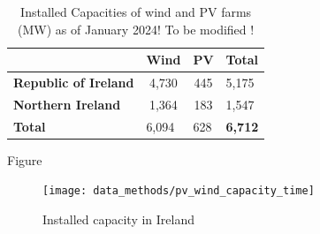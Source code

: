 \documentclass[a4paper, 11pt]{article}
\begin{document}
\begin{table}[!ht]
	\centering
	\begin{tabular}{l|cc|l|}
		\cline{2-4}
		& \textbf{Wind} & \textbf{PV} & \textbf{Total} \\ \hline
		\multicolumn{1}{|l|}{\textbf{Republic of Ireland}} & 4,730         & 445         & 5,175          \\
		\multicolumn{1}{|l|}{\textbf{Northern Ireland}}    & 1,364         & 183         & 1,547          \\ \hline
		\multicolumn{1}{|l|}{\textbf{Total}} & \multicolumn{1}{l}{6,094} & \multicolumn{1}{l|}{628} & \textbf{6,712} \\ \hline
	\end{tabular}
	\caption{Installed Capacities of wind and PV farms (MW) as of January 2024! To be modified !}
	\label{tab:installed_capacities}
\end{table}

Figure 

\begin{figure}[!ht]
	\centering
	\texttt{[image: data\_methods/pv\_wind\_capacity\_time]}
	\caption{Installed capacity in Ireland}
	\label{fig:pv_wind_capacity_time}
\end{figure}
\end{document}
